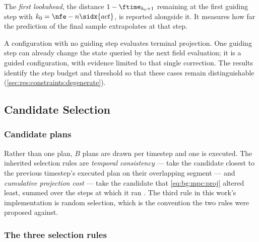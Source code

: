 The \emph{first lookahead}, the distance $1-\ftime_{k_{0}+1}$ remaining at the first guiding step with
$k_{0} = \nfe - n\sidx{act}$, is reported alongside it. It measures how far the prediction of the final
sample extrapolates at that step.

A configuration with no guiding step evaluates terminal projection. One guiding step can already
change the state queried by the next field evaluation; it is a guided configuration, with evidence
limited to that single correction. The results identify the step budget and threshold so that these
cases remain distinguishable (\autoref{sec:res:constraints:degenerate}).

\subsection{Candidate Selection}\label{sec:method:selection}

\subsubsection*{Candidate plans}

Rather than one plan, $B$ plans are drawn per timestep and one is executed. The inherited
selection rules are \emph{temporal consistency} --- take the candidate closest to the previous
timestep's executed plan on their overlapping segment --- and \emph{cumulative projection
cost} --- take the candidate that \eqref{eq:bg:mpc:proj} altered least, summed over the steps
at which it ran \parencite[Sec.~5.4]{romer2025diffusion}. The third rule in this work's implementation is random selection,
which is the convention the two rules were proposed against.

\subsubsection*{The three selection rules}

